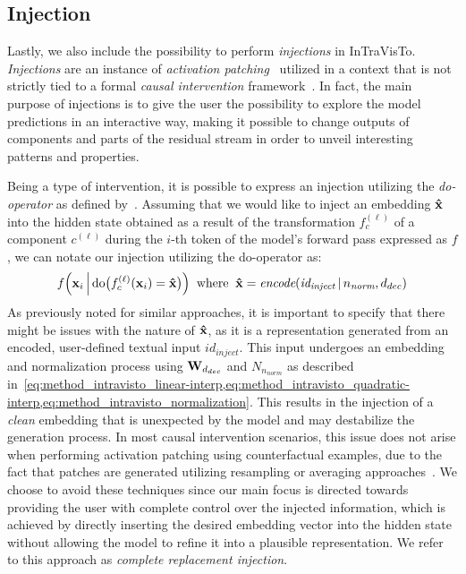 \subsection{Injection}\label{ssec:method_intravisto_injection}

Lastly, we also include the possibility to perform \emph{injections} in InTraVisTo.
\emph{Injections} are an instance of \emph{activation patching}~\cite{olsson2022,meng2022,hanna2023,conmy2023,wang2023,mohebbi2023,zhang2024} utilized in a context that is not strictly tied to a formal \emph{causal intervention} framework~\cite{geiger2021,mcgrath2023}.
In fact, the main purpose of injections is to give the user the possibility to explore the model predictions in an interactive way, making it possible to change outputs of components and parts of the residual stream in order to unveil interesting patterns and properties.

Being a type of intervention, it is possible to express an injection utilizing the \emph{do-operator} as defined by~\citet{pearl2009}.
Assuming that we would like to inject an embedding $\bm{\mathbf{\hat x}}$ into the hidden state obtained as a result of the transformation $f_c^{(\ell)}$ of a component $c^{(\ell)}$ during the $i$-th token of the model's forward pass expressed as $f$, we can notate our injection utilizing the do-operator as:
\begin{equation}
    \label{eq:method_intravisto_inj_complete}
    f\Bigl(\bm{\mathbf{x}}_i \, \Big| \, \text{do}\bigl(f_c^{(\ell)}(\bm{\mathbf{x}}_i) = \bm{\mathbf{\hat x}}\bigr)\Bigr)
    \;\; \text{where} \;\; \bm{\mathbf{\hat x}} = \textit{encode}(\textit{id}_{\textit{inject}} \,|\, n_\textit{norm}, d_{dec})
\end{equation}
As previously noted for similar approaches, it is important to specify that there might be issues with the nature of $\bm{\mathbf{\hat x}}$, as it is a representation generated from an encoded, user-defined textual input ${id}_{\textit{inject}}$.
This input undergoes an embedding and normalization process using $\bm{\mathbf{W}}_{d_{dec}}$ and $N_{n_\textit{norm}}$ as described in~\cref{eq:method_intravisto_linear-interp,eq:method_intravisto_quadratic-interp,eq:method_intravisto_normalization}.
This results in the injection of a \emph{clean} embedding that is unexpected by the model and may destabilize the generation process.
In most causal intervention scenarios, this issue does not arise when performing activation patching using counterfactual examples, due to the fact that patches are generated utilizing resampling or averaging approaches~\cite{hanna2023,conmy2023,wang2023}.
We choose to avoid these techniques since our main focus is directed towards providing the user with complete control over the injected information, which is achieved by directly inserting the desired embedding vector into the hidden state without allowing the model to refine it into a plausible representation.
We refer to this approach as \emph{complete replacement injection}.

